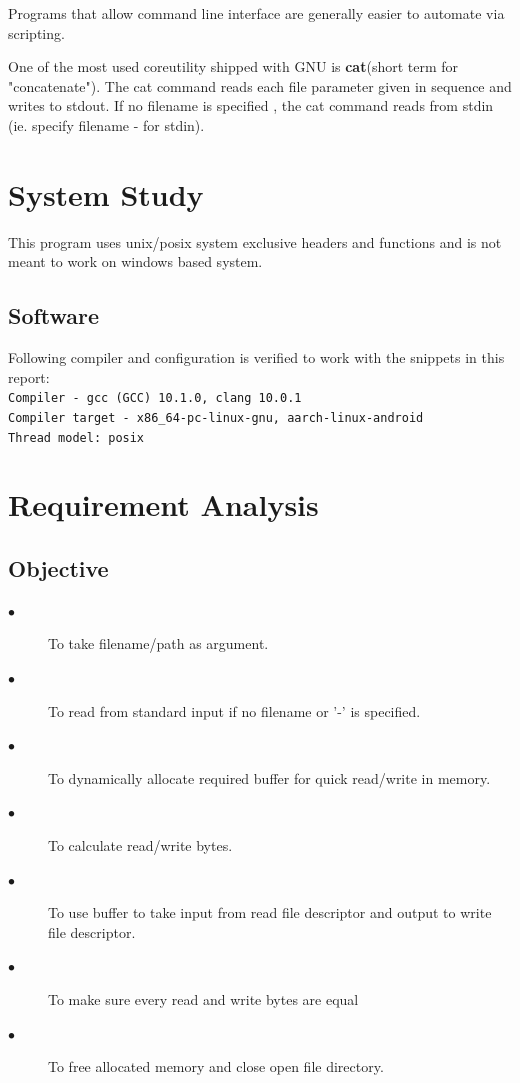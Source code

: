 \documentclass[12pt,a4paper,oneside]{report}
\begin{document}
Programs that allow command line interface are generally easier to automate via scripting.

One of the most used coreutility shipped with GNU is \textbf{cat}(short term for "concatenate"). The cat command reads each file parameter given in sequence and writes to stdout. If no filename is specified , the cat command reads from stdin (ie. specify filename - for stdin).

\chapter*{System Study}
This program uses unix/posix system exclusive headers and functions and is not meant to work on windows based system.
\section*{Software}
Following compiler and configuration is verified to work with the snippets in this report:\\
\texttt{Compiler - gcc (GCC) 10.1.0, clang 10.0.1\\
Compiler target - x86\_64-pc-linux-gnu, aarch-linux-android\\Thread model: posix
}

\chapter*{Requirement Analysis}
\section*{Objective}
\begin{description}
  \item[$\bullet$ ] To take filename/path as argument.
  \item[$\bullet$ ] To read from standard input if no filename or '-' is specified.
  \item[$\bullet$ ] To dynamically allocate required buffer for quick read/write in memory.
  \item[$\bullet$ ] To calculate read/write bytes.
  \item[$\bullet$ ] To use buffer to take input from read file descriptor and output to write file descriptor.
  \item[$\bullet$ ] To make sure every read and write bytes are equal
  \item[$\bullet$ ] To free allocated memory and close open file directory.

\end{description}
\end{document}
